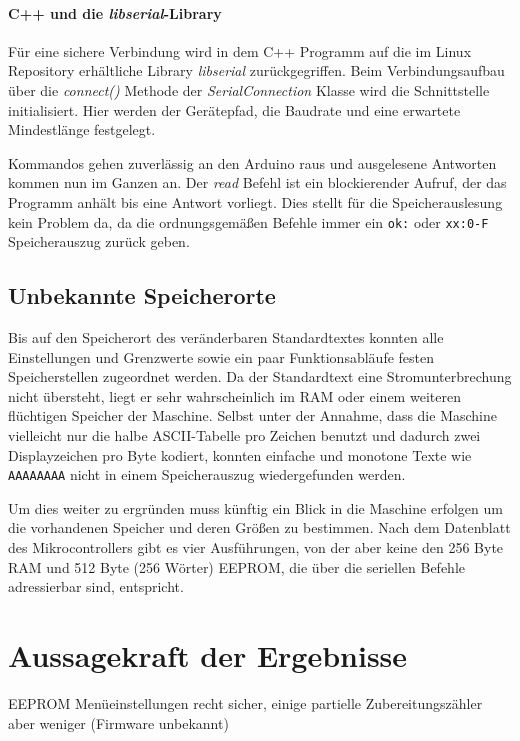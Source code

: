 \paragraph{C++ und die \textit{libserial}-Library}
Für eine sichere Verbindung wird in dem C++ Programm auf die im Linux Repository erhältliche Library \textit{libserial} zurückgegriffen.
Beim Verbindungsaufbau über die \textit{connect()} Methode der \textit{SerialConnection} Klasse wird die Schnittstelle initialisiert.
Hier werden der Gerätepfad, die Baudrate und eine erwartete Mindestlänge festgelegt.

Kommandos gehen zuverlässig an den Arduino raus und ausgelesene Antworten kommen nun im Ganzen an.
Der \textit{read} Befehl ist ein blockierender Aufruf, der das Programm anhält bis eine Antwort vorliegt.
Dies stellt für die Speicherauslesung kein Problem da, da die ordnungsgemäßen Befehle immer ein \texttt{ok:} oder \texttt{xx:0-F} Speicherauszug zurück geben.

\subsection{Unbekannte Speicherorte}\label{subsec:UnbekannteSpeicherorte}
Bis auf den Speicherort des veränderbaren Standardtextes konnten alle Einstellungen und Grenzwerte sowie ein paar Funktionsabläufe festen Speicherstellen zugeordnet werden.
Da der Standardtext eine Stromunterbrechung nicht übersteht, liegt er sehr wahrscheinlich im \ac{RAM} oder einem weiteren flüchtigen Speicher der Maschine.
Selbst unter der Annahme, dass die Maschine vielleicht nur die halbe \ac{ASCII}-Tabelle pro Zeichen benutzt und dadurch zwei Displayzeichen pro Byte kodiert, konnten einfache und monotone Texte wie \texttt{AAAAAAAA} nicht in einem Speicherauszug wiedergefunden werden.

Um dies weiter zu ergründen muss künftig ein Blick in die Maschine erfolgen um die vorhandenen Speicher und deren Größen zu bestimmen.
Nach dem Datenblatt des Mikrocontrollers \cite{JuraMicrocontroller} gibt es vier Ausführungen, von der aber keine den 256 Byte \ac{RAM} und 512 Byte (256 Wörter) \ac{EEPROM}, die über die seriellen Befehle adressierbar sind, entspricht.

\section{Aussagekraft der Ergebnisse}\label{sec:AussagekraftDerErgebnisse}
EEPROM Menüeinstellungen recht sicher, einige partielle Zubereitungszähler aber weniger (Firmware unbekannt)

